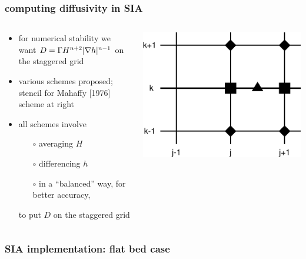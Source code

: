 \begin{frame}
  \frametitle{computing diffusivity in SIA}

\begin{columns}
\begin{column}{0.6\textwidth}
\begin{itemize}
\item for numerical stability we want $D = \Gamma H^{n+2} |\nabla h|^{n-1}$ on the staggered grid
\item various schemes proposed; stencil for Mahaffy [1976]\nocite{Mahaffy} scheme at right
\item all schemes involve
  \begin{itemize}
  \item[$\circ$] averaging $H$
  \item[$\circ$] differencing $h$
  \item[$\circ$] in a ``balanced'' way, for better accuracy,
  \end{itemize}
to put $D$ on the staggered grid
\end{itemize}
\end{column}

\begin{column}{0.4\textwidth}
  \includegraphics[width=1.0\textwidth]{photos/mahaffystencil}
\end{column}
\end{columns}
\end{frame}


\begin{frame}
  \frametitle{SIA implementation: flat bed case}

\end{frame}


